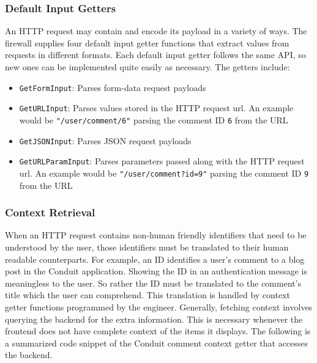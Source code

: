 \iffalse

The \lstinline{SupplyOptions} is a boolean flag specifying whether protected routes should respond with an HTTP OPTIONS verb or not. The \lstinline{Verbose} is a boolean flag specifying whether the firewall should log the HTTP requests it processes.

\fi

\subsubsection{Default Input Getters}\label{Sec:DefaultInputGetters}

An HTTP request may contain and encode its payload in a variety of ways. The firewall supplies four default input getter functions that extract values from requests in different formats. Each default input getter follows the same API, so new ones can be implemented quite easily as necessary. The getters include:

\begin{itemize}[nosep]
\item \lstinline{GetFormInput}: Parses form-data request payloads

\item \lstinline{GetURLInput}: Parses values stored in the HTTP request url. An example would be \lstinline{"/user/comment/6"} parsing the comment ID \lstinline{6} from the URL

\item \lstinline{GetJSONInput}: Parses JSON request payloads

\item \lstinline{GetURLParamInput}: Parses parameters passed along with the HTTP request url. An example would be \lstinline{"/user/comment?id=9"} parsing the comment ID \lstinline{9} from the URL

\end{itemize}

\subsubsection{Context Retrieval}\label{Sec:ContextRetrieval}


When an HTTP request contains non-human friendly identifiers that need to be understood by the user, those identifiers must be translated to their human readable counterparts. For example, an ID identifies a user's comment to a blog post in the Conduit application. Showing the ID in an authentication message is meaningless to the user. So rather the ID must be translated to the comment's title which the user can comprehend. This translation is handled by context getter functions programmed by the engineer. Generally, fetching context involves querying the backend for the extra information. This is necessary whenever the frontend does not have complete context of the items it displays. The following is a summarized code snippet of the Conduit comment context getter that accesses the backend.


